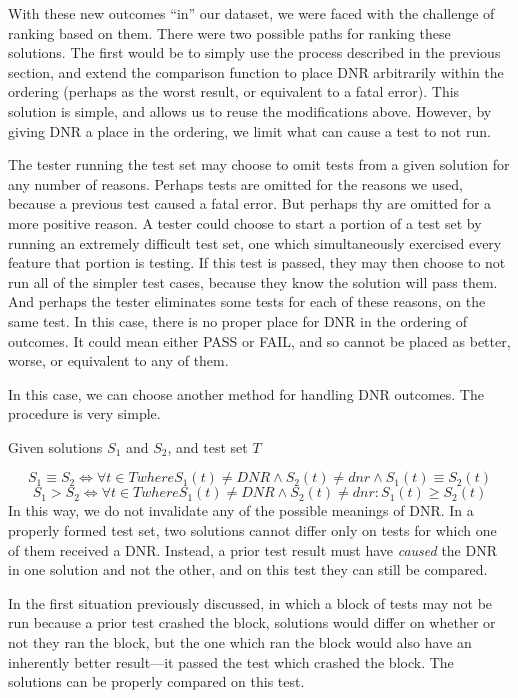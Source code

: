 \documentclass[11pt,twoside]{article}
\newcommand\dnr{\mathit{DNR}}
\begin{document}
With these new outcomes ``in'' our dataset, we were faced with the challenge of ranking based on them. There were two possible paths for ranking these solutions. The first would be to simply use the process described in the previous section, and extend the comparison function to place DNR arbitrarily within the ordering (perhaps as the worst result, or equivalent to a fatal error). This solution is simple, and allows us to reuse the modifications above. However, by giving DNR a place in the ordering, we limit what can cause a test to not run.

The tester running the test set may choose to omit tests from a given solution for any number of reasons. Perhaps tests are omitted for the reasons we used, because a previous test caused a fatal error. But perhaps thy are omitted for a more positive reason. A tester could choose to start a portion of a test set by running an extremely difficult test set, one which simultaneously exercised every feature that portion is testing. If this test is passed, they may then choose to not run all of the simpler test cases, because they know the solution will pass them. And perhaps the tester eliminates some tests for each of these reasons, on the same test. In this case, there is no proper place for DNR in the ordering of outcomes. It could mean either PASS or FAIL, and so cannot be placed as better, worse, or equivalent to any of them.

In this case, we can choose another method for handling DNR outcomes. The procedure is very simple.

\centerline{Given solutions $S_1$ and $S_2$, and test set $T$}
$$S_1 \equiv S_2 \iff \forall t \in T where S_1(t) \neq \dnr \wedge S_2(t) \neq dnr \wedge S_1(t) \equiv S_2(t)$$
$$S_1 > S_2 \iff \forall t \in T where S_1(t) \neq \dnr \wedge S_2(t) \neq dnr : S_1(t) \geq S_2(t)$$
In this way, we do not invalidate any of the possible meanings of DNR. In a properly formed test set, two solutions cannot differ only on tests for which one of them received a DNR. Instead, a prior test result must have \emph{caused} the DNR in one solution and not the other, and on this test they can still be compared. 

In the first situation previously discussed, in which a block of tests may not be run because a prior test crashed the block, solutions would differ on whether or not they ran the block, but the one which ran the block would also have an inherently better result---it passed the test which crashed the block. The solutions can be properly compared on this test.
\end{document}
